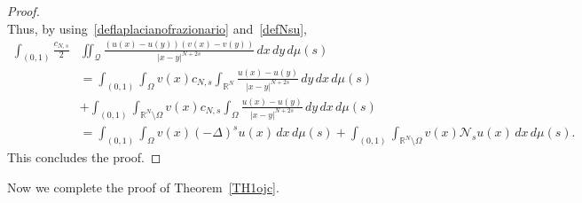 \documentclass[12pt,a4paper,intlimits,sumlimits]{amsart}
\def \R {\mathbb{R}}
\def \Ns {\mathscr{N}_{s}}
\def \Q {\mathcal Q}
\theoremstyle{definition}
\theoremstyle{plain}
\numberwithin{equation}{section}
\begin{document}
\begin{proof}
\[\]
Thus, by using~\eqref{deflaplacianofrazionario} and~\eqref{defNsu},
\[
\begin{aligned}
\int_{(0, 1)} \frac{c_{N,s}}{2}&\iint_\Q
\frac{(u(x)-u(y))(v(x)-v(y))}{|x-y|^{N+2s}}\,dx\,dy\,d\mu(s) \\
&=\int_{(0, 1)} \int_\Omega v(x) c_{N,s}
\int_{\R^N}\frac{u(x)-u(y)}{|x-y|^{N+2s}}\,dy \,dx\,d\mu(s) \\
&+\int_{(0, 1)}\int_{\R^N\setminus \Omega}v(x) c_{N,s}
\int_{\Omega}\frac{u(x)-u(y)}{|x-y|^{N+2s}}\,dy \,dx\,d\mu(s)
\\
&=\int_{(0, 1)} \int_\Omega v(x)(-\Delta)^su(x)\,dx\,d\mu(s)
+\int_{(0, 1)}\int_{\R^N\setminus \Omega}v(x)\Ns u(x)\,dx \,d\mu(s).
\end{aligned}
\]
This concludes the proof.
\end{proof}

Now we complete the proof of Theorem~\ref{TH1ojc}.
\end{document}
